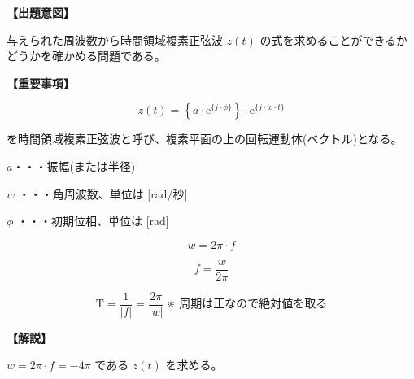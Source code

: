 \noindent \textbf{【出題意図】}

\bigskip
\noindent 与えられた周波数から時間領域複素正弦波 $z(t)$ の式を求めることができるかどうかを確かめる問題である。

\vspace{1em}
\noindent \textbf{【重要事項】}

\[
z(t) =  \left \{ a \cdot \textrm{e}^{\{j \cdot \phi\}} \right \} 
\cdot \textrm{e}^{\{j \cdot w \cdot t \}}
\]

\bigskip
\noindent を時間領域複素正弦波と呼び、複素平面の上の回転運動体(ベクトル)となる。

\bigskip
\noindent\quad  $a$・・・振幅(または半径)

\bigskip
\noindent\quad $w$ ・・・角周波数、単位は [rad/秒]

\bigskip
\noindent\quad $\phi$ ・・・初期位相、単位は [rad]

\[
w = 2\pi \cdot f
\]

\[
f = \frac{w}{2\pi} 
\]

\[
\textrm{T} = \frac{1}{|f|} = \frac{2\pi}{|w|}   \ \mbox{※ 周期は正なので絶対値を取る}
\]

\bigskip

\vspace{1em}
\noindent \textbf{【解説】}

\bigskip
\noindent $w = 2\pi \cdot f = -4\pi$ である $z(t)$ を求める。
